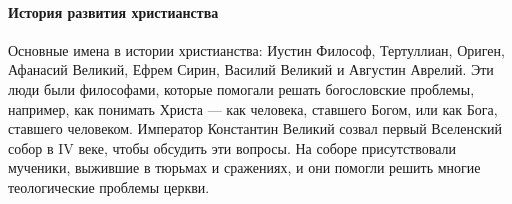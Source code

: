 \paragraph{История развития христианства}

Основные имена в истории христианства: Иустин Философ, Тертуллиан, Ориген, Афанасий Великий, Ефрем Сирин, Василий Великий и Августин Аврелий. Эти люди были философами, которые помогали решать богословские проблемы, например, как понимать Христа — как человека, ставшего Богом, или как Бога, ставшего человеком.
Император Константин Великий созвал первый Вселенский собор в IV веке, чтобы обсудить эти вопросы. На соборе присутствовали мученики, выжившие в тюрьмах и сражениях, и они помогли решить многие теологические проблемы церкви.

